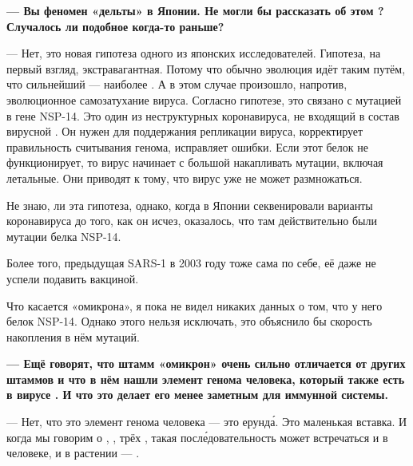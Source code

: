 {\bf --- Вы  феномен  «дельты» в Японии. Не могли бы рассказать об этом ? Случалось ли подобное когда-то раньше?}

--- Нет, это новая гипотеза одного из японских исследователей. Гипотеза, на первый взгляд, экстравагантная. Потому что обычно эволюция идёт таким путём, что  сильнейший --- наиболее . А в этом случае произошло, напротив, эволюционное самозатухание вируса. Согласно гипотезе, это связано с мутацией в гене NSP-14. Это один из неструктурных  коронавируса, не входящий в состав вирусной . Он нужен для поддержания репликации вируса, корректирует правильность считывания генома, исправляет ошибки. Если этот белок не функционирует, то вирус начинает с большой  накапливать мутации, включая летальные. Они приводят к тому, что вирус уже не может размножаться.

Не знаю,  ли эта гипотеза, однако, когда в Японии секвенировали варианты коронавируса до того, как он исчез, оказалось, что там действительно были мутации белка NSP-14.

Более того, предыдущая  SARS-1 в 2003 году тоже  сама по себе, её даже не успели подавить вакциной.

Что касается «омикрона», я пока не видел никаких данных о том, что у него  белок NSP-14. Однако этого нельзя исключать, это объяснило бы скорость накопления в нём мутаций.

{\bf --- Ещё говорят, что штамм «омикрон» очень сильно отличается от других штаммов и что в нём нашли элемент генома человека, который также есть в вирусе . И что это делает его менее заметным для иммунной системы.}

--- Нет, что это элемент генома человека --- это ерунд\'{а}. Это маленькая вставка. И когда мы говорим о , , трёх , такая посл\'{е}довательность может встречаться и в человеке, и в растении --- .

